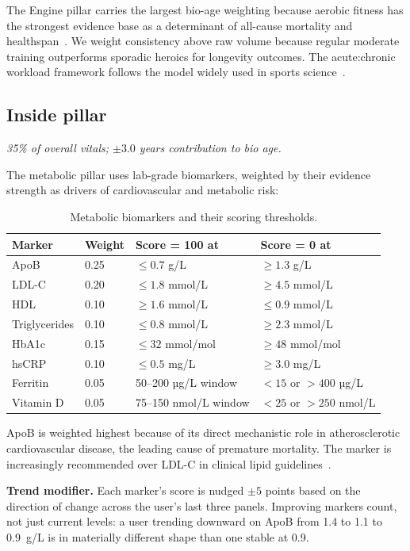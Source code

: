 \documentclass[10pt, a4paper]{article}
\begin{document}
The Engine pillar carries the largest bio-age weighting because aerobic fitness has the strongest evidence base as a determinant of all-cause mortality and healthspan~\cite{kodama_vo2max_2009}. We weight consistency above raw volume because regular moderate training outperforms sporadic heroics for longevity outcomes. The acute:chronic workload framework follows the model widely used in sports science~\cite{gabbett_acwr_2016}.

\subsection{Inside pillar}
\textit{35\% of overall vitals; $\pm 3.0$ years contribution to bio age.}

The metabolic pillar uses lab-grade biomarkers, weighted by their evidence strength as drivers of cardiovascular and metabolic risk:

\begin{table}[h]
\centering
\caption{Metabolic biomarkers and their scoring thresholds.}
\label{tab:inside}
\small
\begin{tabularx}{\linewidth}{@{} L{2.5cm} L{1.4cm} X X @{}}
\toprule
\textbf{Marker} & \textbf{Weight} & \textbf{Score = 100 at} & \textbf{Score = 0 at} \\
\midrule
ApoB & 0.25 & $\leq 0.7$ g/L & $\geq 1.3$ g/L \\
LDL-C & 0.20 & $\leq 1.8$ mmol/L & $\geq 4.5$ mmol/L \\
HDL & 0.10 & $\geq 1.6$ mmol/L & $\leq 0.9$ mmol/L \\
Triglycerides & 0.10 & $\leq 0.8$ mmol/L & $\geq 2.3$ mmol/L \\
HbA1c & 0.15 & $\leq 32$ mmol/mol & $\geq 48$ mmol/mol \\
hsCRP & 0.10 & $\leq 0.5$ mg/L & $\geq 3.0$ mg/L \\
Ferritin & 0.05 & 50--200 µg/L window & $<15$ or $>400$ µg/L \\
Vitamin D & 0.05 & 75--150 nmol/L window & $<25$ or $>250$ nmol/L \\
\bottomrule
\end{tabularx}
\end{table}

ApoB is weighted highest because of its direct mechanistic role in atherosclerotic cardiovascular disease, the leading cause of premature mortality. The marker is increasingly recommended over LDL-C in clinical lipid guidelines~\cite{eas_apob_2022}.

\textbf{Trend modifier.} Each marker's score is nudged $\pm 5$ points based on the direction of change across the user's last three panels. Improving markers count, not just current levels: a user trending downward on ApoB from 1.4 to 1.1 to 0.9~g/L is in materially different shape than one stable at 0.9.
\end{document}
